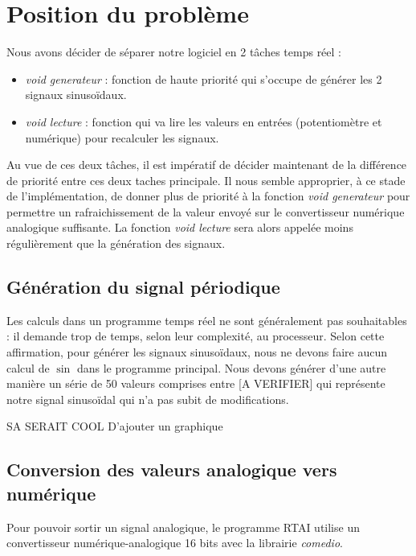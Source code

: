 \section{Position du problème}
Nous avons décider de séparer notre logiciel en 2 tâches temps réel : \begin{itemize}
\item \emph{void generateur} : fonction de haute priorité qui s'occupe de générer les 2 signaux sinusoïdaux. 
\item \emph{void lecture} : fonction qui va lire les valeurs en entrées (potentiomètre et numérique) pour recalculer les signaux.
\end{itemize}
Au vue de ces deux tâches, il est impératif de décider maintenant de la différence de priorité entre ces deux taches principale. Il nous semble approprier, à ce stade de l'implémentation, de donner plus de priorité à la fonction \emph{void generateur} pour permettre un rafraichissement de la valeur envoyé sur le convertisseur numérique analogique suffisante. La fonction \emph{void lecture} sera alors appelée moins régulièrement que la génération des signaux.
\subsection{Génération du signal périodique}
Les calculs dans un programme temps réel ne sont généralement pas souhaitables : il demande trop de temps, selon leur complexité, au processeur. Selon cette affirmation, pour générer les signaux sinusoïdaux, nous ne devons faire aucun calcul de $\sin$ dans le programme principal. Nous devons générer d'une autre manière un série de 50 valeurs comprises entre [A VERIFIER] qui représente notre signal sinusoïdal qui n'a pas subit de modifications.

SA SERAIT COOL D'ajouter un graphique
\subsection{Conversion des valeurs analogique vers numérique}
Pour pouvoir sortir un signal analogique, le programme RTAI utilise un convertisseur numérique-analogique 16 bits avec la librairie \emph{comedio}. 
